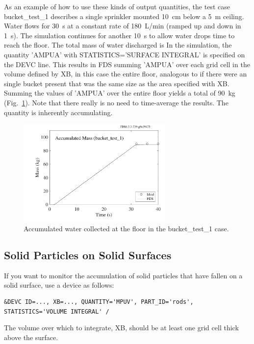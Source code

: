 \documentclass[11pt]{book}
\begin{document}
As an example of how to use these kinds of output quantities, the test case {\ct bucket\_test\_1} describes a single sprinkler mounted 10~cm below a 5~m ceiling. Water flows for 30~s at a constant rate of 180~L/min (ramped up and down in 1~s).  The simulation continues for another 10~s to allow water drops time to reach the floor. The total mass of water discharged is
\be
\ee
In the simulation, the quantity {\ct 'AMPUA'} with {\ct STATISTICS='SURFACE INTEGRAL'} is specified on the {\ct DEVC} line.  This results in FDS summing {\ct 'AMPUA'} over each grid cell in the volume defined by {\ct XB}, in this case the entire floor, analogous to if there were an single bucket present that was the same size as the area specified with {\ct XB}. Summing the values of {\ct 'AMPUA'} over the entire floor yields a total of 90~kg (Fig.~\ref{bucket_test_fig}). Note that there really is no need to time-average the results. The quantity is inherently accumulating.

\begin{figure}[ht]
\centering
\includegraphics[width=3in]{SCRIPT_FIGURES/bucket_test_1}
\caption[Results of the {\ct bucket\_test\_1} case]{Accumulated water collected at the floor in the {\ct bucket\_test\_1} case.}
\label{bucket_test_fig}
\end{figure}


\subsection{Solid Particles on Solid Surfaces}

If you want to monitor the accumulation of solid particles that have fallen on a solid surface, use a device as follows:
\begin{lstlisting}
&DEVC ID=..., XB=..., QUANTITY='MPUV', PART_ID='rods', STATISTICS='VOLUME INTEGRAL' /
\end{lstlisting}
The volume over which to integrate, {\ct XB}, should be at least one grid cell thick above the surface.
\end{document}
